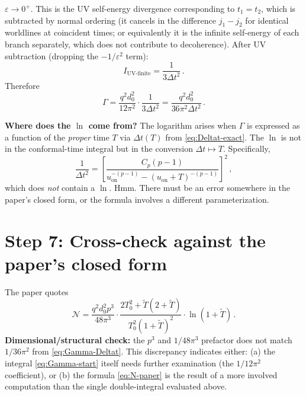 \documentclass[12pt]{article}
\newcommand{\Nnum}{\mathcal{N}}
\newcommand{\lb}{\left}
\newcommand{\rb}{\right}
\begin{document}
$\varepsilon\to 0^{+}$.  This is the UV self-energy divergence corresponding to
$t_{1}=t_{2}$, which is subtracted by normal ordering (it cancels in the difference
$j_{1}-j_{2}$ for identical worldlines at coincident times; or equivalently it is
the infinite self-energy of each branch separately, which does not contribute to
decoherence).  After UV subtraction (dropping the $-1/\varepsilon^{2}$ term):
%
\begin{equation}
  I_{\text{UV-finite}}
  =
  \frac{1}{3\Delta t^{2}} \,.
\end{equation}
%
Therefore
%
\begin{equation}
  \Gamma
  =
  \frac{q^{2}d_{0}^{2}}{12\pi^{2}}\cdot\frac{1}{3\Delta t^{2}}
  =
  \frac{q^{2}d_{0}^{2}}{36\pi^{2}\Delta t^{2}} \,.
  \label{eq:Gamma-Deltat}
\end{equation}

\noindent\textbf{Where does the $\ln$ come from?}  The logarithm arises when
$\Gamma$ is expressed as a function of the \emph{proper} time $T$ via
$\Delta t(T)$ from \eqref{eq:Deltat-exact}.  The $\ln$ is not in the conformal-time
integral but in the conversion $\Delta t \mapsto T$.  Specifically,
%
\begin{equation}
  \frac{1}{\Delta t^{2}}
  =
  \lb[\frac{C_{p}(p-1)}{u_{\mathrm{on}}^{-(p-1)}-(u_{\mathrm{on}}+T)^{-(p-1)}}\rb]^{2} \,,
\end{equation}
%
which does \emph{not} contain a $\ln$.  Hmm.  There must be an error somewhere in
the paper's closed form, or the formula involves a different parameterization.

\section*{Step 7: Cross-check against the paper's closed form}

The paper quotes
%
\begin{equation}
  \Nnum = \frac{q^{2}d_{0}^{2}p^{3}}{48\pi^{3}}
  \cdot\frac{2T_{0}^{2}+\widetilde{T}(2+\widetilde{T})}{T_{0}^{2}(1+\widetilde{T})^{2}}
  \cdot\ln(1+\widetilde{T}) \,.
  \label{eq:N-paper}
\end{equation}
%
\textbf{Dimensional/structural check:} the $p^{3}$ and $1/48\pi^{3}$ prefactor does not
match $1/36\pi^{2}$ from \eqref{eq:Gamma-Deltat}.  This discrepancy indicates either:
(a) the integral \eqref{eq:Gamma-start} itself needs further examination (the $1/12\pi^{2}$
coefficient), or (b) the formula \eqref{eq:N-paper} is the result of a more involved
computation than the single double-integral evaluated above.
\end{document}

